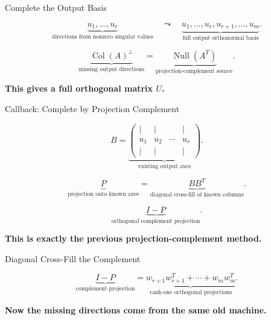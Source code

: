 \documentclass[10pt]{beamer}
\theoremstyle{definition}
\newcommand{\x}[1]{\alert{\textbf{#1}}}
\begin{document}
\begin{frame}{Complete the Output Basis}

$$
\underbrace{u_1,\ldots,u_r}_{\text{directions from nonzero singular values}}
\quad\leadsto\quad
\underbrace{u_1,\ldots,u_r,u_{r+1},\ldots,u_m}_{\text{full output orthonormal basis}}.
$$

\vfill

$$
\underbrace{\operatorname{Col}(A)^\perp}_{\text{missing output directions}}
=
\underbrace{\operatorname{Null}(A^T)}_{\text{projection-complement source}}.
$$

\vfill

\begin{center}
\x{This gives a full orthogonal matrix $U$.}
\end{center}

\end{frame}


\begin{frame}{Callback: Complete by Projection Complement}

$$
B=
\underbrace{\begin{pmatrix}
|&|&&|\\
u_1&u_2&\cdots&u_r\\
|&|&&|
\end{pmatrix}}_{\text{existing output axes}}.
$$

\vfill

$$
\underbrace{P}_{\text{projection onto known axes}}
=
\underbrace{BB^T}_{\text{diagonal cross-fill of known columns}}.
$$

\vfill

$$
\underbrace{I-P}_{\text{orthogonal complement projection}}.
$$

\begin{center}
\x{This is exactly the previous projection-complement method.}
\end{center}

\end{frame}


\begin{frame}{Diagonal Cross-Fill the Complement}

\vfill

$$
\underbrace{I-P}_{\text{complement projection}}
=
\underbrace{w_{r+1}w_{r+1}^T+\cdots+w_mw_m^T}_{\text{rank-one orthogonal projections}}.
$$

\vfill

\begin{center}
\x{Now the missing directions come from the same old machine.}
\end{center}

\end{frame}
\end{document}
